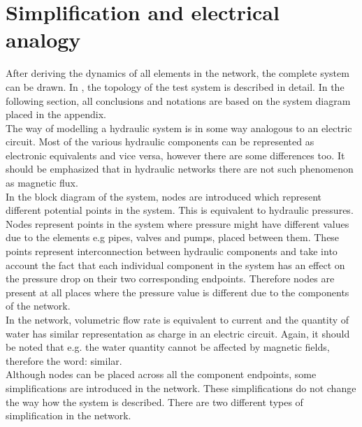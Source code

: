 \section{Simplification and electrical analogy}  
\label{SystemModel}

After deriving the dynamics of all elements in the network, the complete system can be drawn. In , the topology of the test system is described in detail. In the following section, all conclusions and notations are based on the system diagram placed in the appendix. 
\\
The way of modelling a hydraulic system is in some way analogous to an electric circuit. Most of the various hydraulic components can be represented as electronic equivalents and vice versa, however there are some differences too. It should be emphasized that in hydraulic networks there are not such phenomenon as magnetic flux. 
\\
In the block diagram of the system, nodes are introduced which represent different potential points in the system. This is equivalent to hydraulic pressures. Nodes represent points in the system where pressure might have different values due to the elements e.g pipes, valves and pumps, placed between them. These points represent interconnection between hydraulic components and take into account the fact that each individual component in the system has an effect on the pressure drop on their two corresponding endpoints. Therefore nodes are present at all places where the pressure value is different due to the components of the network. 
\\
In the network, volumetric flow rate is equivalent to current and the quantity of water has similar representation as charge in an electric circuit. Again, it should be noted that e.g. the water quantity cannot be affected by magnetic fields, therefore the word: similar.
\\ 
Although nodes can be placed across all the component endpoints, some simplifications are introduced in the network. These simplifications do not change the way how the system is described. There are two different types of simplification in the network. %


